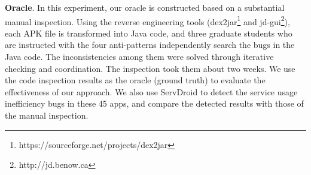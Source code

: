 \documentclass[sigconf,review, anonymous]{acmart}
\begin{document}
\textbf{Oracle}. In this experiment, our oracle is constructed based on a
substantial manual inspection. Using the reverse engineering tools
(\textsf{dex2jar}\footnote{https://sourceforge.net/projects/dex2jar} and
\textsf{jd-gui}\footnote{http://jd.benow.ca}), each APK file is transformed
into Java code, and three graduate students who are instructed with the four
anti-patterns independently search the bugs in the Java code. The
inconsistencies among them were solved through iterative checking and
coordination. The inspection took them about two weeks. We use the code
inspection results as the oracle (ground truth) to evaluate the effectiveness of our approach.
We also use {\sf ServDroid} to detect the service usage inefficiency bugs in
these 45 apps, and compare the detected results with those of the manual
inspection.
\end{document}
